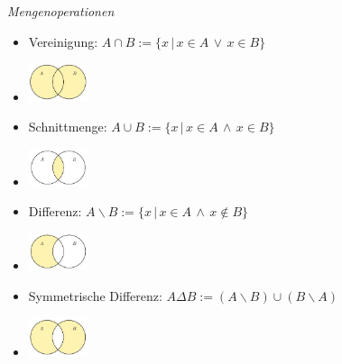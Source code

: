 \noindent
\textit{Mengenoperationen}\linebreak
\begin{itemize}
    \item Vereinigung: $A \cap B := \{x\,|\,x \in A\, \lor\, x \in B \}$
    \item \includegraphics[width=50pt]{./images/vereinigung.jpg}
    \item Schnittmenge: $A \cup B := \{x\,|\,x \in A\, \land\, x \in B \}$
    \item \includegraphics[width=50pt]{./images/schnittmenge.jpg}
    \item Differenz: $A \backslash B := \{x\,|\,x \in A\, \land\, x \notin B \}$
    \item \includegraphics[width=50pt]{./images/differenz.jpg}
    \item Symmetrische Differenz: $A\Delta B := (A\backslash B)\cup (B\backslash A)$
    \item \includegraphics[width=50pt]{./images/systematische_differenz.jpg}
\end{itemize}
\vspace{1mm}

